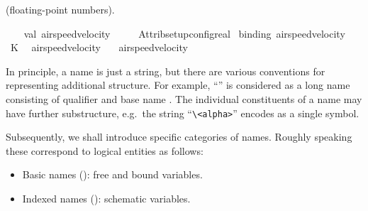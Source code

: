 \begin{isabellebody}
\begin{isamarkuptext}
  (floating-point numbers).%
\end{isamarkuptext}%
\isamarkuptrue%
%
\isadelimML
%
\endisadelimML
%
\isatagML
{}\isamarkupfalse%
\ {}\isanewline
\ \ val\ airspeed{}velocity\ {}\isanewline
\ \ \ \ Attrib{}setup{}config{}real\ %
\isaantiq
binding\ airspeed{}velocity{}%
\endisaantiq
\ {}K\ {}{}{}{}\isanewline
{}%
\endisatagML
{\isafoldML}%
%
\isadelimML
%
\endisadelimML
\isanewline
\isanewline
{}\isamarkupfalse%
\ {}{}airspeed{}velocity\ {}\ {}{}{}{}\isanewline
{}\isamarkupfalse%
\ {}{}airspeed{}velocity\ {}\ {}{}{}{}{}%
\isamarkuptrue%
%
\begin{isamarkuptext}%
In principle, a name is just a string, but there are various
  conventions for representing additional structure.  For example,
  ``'' is considered as a long name consisting of
  qualifier  and base name .  The
  individual constituents of a name may have further substructure,
  e.g.\ the string ``\verb,\,\verb,<alpha>,'' encodes as a single
  symbol.

  \medskip Subsequently, we shall introduce specific categories of
  names.  Roughly speaking these correspond to logical entities as
  follows:
  \begin{itemize}

  \item Basic names (): free and bound
  variables.

  \item Indexed names (): schematic variables.


\end{itemize}
\end{isamarkuptext}
\end{isabellebody}
